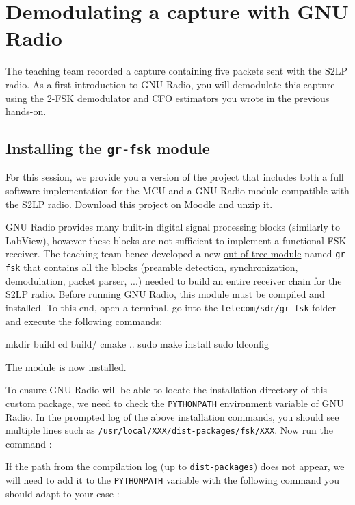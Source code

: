 \section{Demodulating a capture with GNU Radio}

The teaching team recorded a capture containing five packets sent with the S2LP radio.
As a first introduction to GNU Radio, you will demodulate this capture using the 2-FSK demodulator and CFO estimators you wrote in the previous hands-on.

\subsection{Installing the \texttt{gr-fsk} module}

For this session, we provide you a version of the project that includes both a full software implementation for the MCU and a GNU Radio
module compatible with the S2LP radio. Download this project on Moodle and unzip it.

GNU Radio provides many built-in digital signal processing blocks (similarly to LabView), however these blocks are not sufficient to implement a functional FSK receiver.
The teaching team hence developed a new \href{https://wiki.gnuradio.org/index.php/OutOfTreeModules}{out-of-tree module} named
\texttt{gr-fsk} that contains all the blocks (preamble detection, synchronization, demodulation, packet parser, ...) needed to build an entire receiver chain for the S2LP radio.
Before running GNU Radio, this module must be compiled and installed. To this end, open a terminal, go into the \texttt{telecom/sdr/gr-fsk} folder and execute the following commands:

\begin{bash}
    mkdir build
    cd build/
    cmake ..
    sudo make install
    sudo ldconfig
\end{bash}
The module is now installed.

To ensure GNU Radio will be able to locate the installation directory of this custom package, we need to check the \texttt{PYTHONPATH} environment variable of GNU Radio. In the prompted log of the above installation commands, you should see multiple lines such as \texttt{/usr/local/XXX/dist-packages/fsk/XXX}. Now run the command :



If the path from the compilation log (up to \texttt{dist-packages}) does not appear, we will need to add it to the \texttt{PYTHONPATH} variable with the following command you should adapt to your case :


